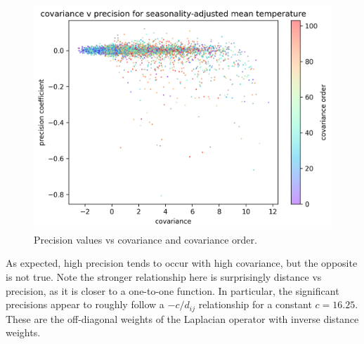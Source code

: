\documentclass[12pt,a4paper]{article} %
\begin{document}
\begin{figure}[!ht]
    \centering
    \includegraphics[width=.8\linewidth]{mean_nearest_error_precision_by_cov.png}
    \caption{Precision values vs covariance and covariance order.}
    \label{fig:cov_precision}
\end{figure}

As expected, high precision tends to occur with high covariance, but the opposite is not true. Note the stronger relationship here is surprisingly distance vs precision, as it is closer to a one-to-one function. In particular, the significant precisions appear to roughly follow a $-c/d_{ij}$ relationship for a constant $c=16.25$. These are the off-diagonal weights of the Laplacian operator with inverse distance weights.
\end{document}
